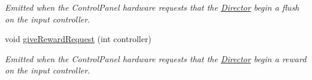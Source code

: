\begin{DoxyCompactItemize}
\begin{DoxyCompactList}\small\item\em Emitted when the Control\-Panel hardware requests that the \hyperlink{class_director}{Director} begin a flush on the input controller. \end{DoxyCompactList}\item 
\hypertarget{class_control_panel_interface_aa31c026d69d3e7644c43f16ea25f82f2}{void \hyperlink{class_control_panel_interface_aa31c026d69d3e7644c43f16ea25f82f2}{give\-Reward\-Request} (int controller)}\label{class_control_panel_interface_aa31c026d69d3e7644c43f16ea25f82f2}

\begin{DoxyCompactList}\small\item\em Emitted when the Control\-Panel hardware requests that the \hyperlink{class_director}{Director} begin a reward on the input controller. \end{DoxyCompactList}\end{DoxyCompactItemize}
